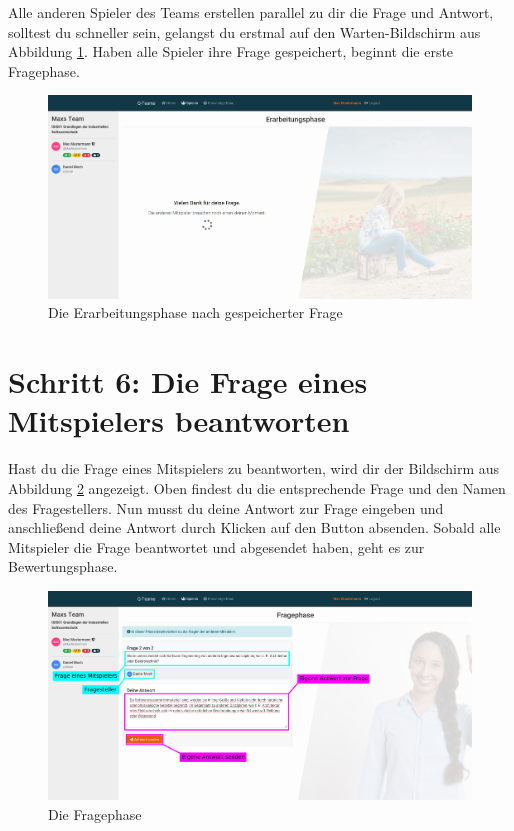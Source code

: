 \documentclass[a4paper,11pt,listof=numbered,glossary=totoc,parskip=half,toc=bib]{scrreprt}
\begin{document}
\begin{appendices}
	Alle anderen Spieler des Teams erstellen parallel zu dir die Frage und Antwort, solltest du schneller sein, gelangst du erstmal auf den Warten-Bildschirm aus Abbildung \ref{fig:guide_erarbeitungsphase_warten}. Haben alle Spieler ihre Frage gespeichert, beginnt die erste Fragephase.
	\begin{figure}[h!]
		\centering
		\includegraphics[width=\textwidth]{UserGuide/Erarbeitungsphase_warten.png}
		\caption{Die Erarbeitungsphase nach gespeicherter Frage}
		\label{fig:guide_erarbeitungsphase_warten}
	\end{figure}
	
	\newpage
	\section*{Schritt 6: Die Frage eines Mitspielers beantworten}
	
	Hast du die Frage eines Mitspielers zu beantworten, wird dir der Bildschirm aus Abbildung \ref{fig:guide_fragephase} angezeigt. Oben findest du die entsprechende Frage und den Namen des Fragestellers. Nun musst du deine Antwort zur Frage eingeben und anschließend deine Antwort durch Klicken auf den Button absenden. Sobald alle Mitspieler die Frage beantwortet und abgesendet haben, geht es zur Bewertungsphase.	
	\begin{figure}[h!]
		\centering
		\includegraphics[width=\textwidth]{UserGuide/Fragephase_beantworten.png}
		\caption{Die Fragephase}
		\label{fig:guide_fragephase}
	\end{figure}
	

\end{appendices}
\end{document}
